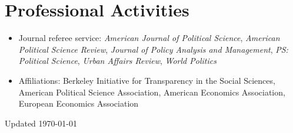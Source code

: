 \documentclass[11pt]{article}
\begin{document}
\section*{Professional Activities}
\color{Black}

\begin{itemize}	

\item[]Journal referee service: \textit{American Journal of Political Science}, \textit{American Political Science Review}, \textit{Journal of Policy Analysis and Management}, \textit{PS: Political Science}, \textit{Urban Affairs Review}, \textit{World Politics}\item[]Affiliations: Berkeley Initiative for Transparency in the Social Sciences, American Political Science Association,  American Economics Association, European Economics Association
\end{itemize}


\vspace*{\fill}

\flushright Updated \today
\end{document}
